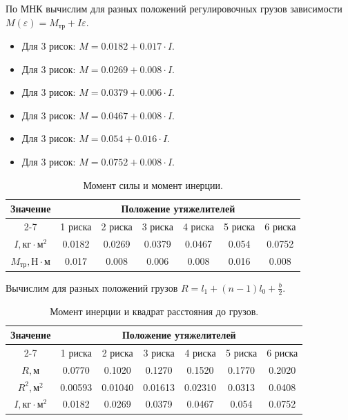 \documentclass[14pt]{extreport}
\begin{document}
По МНК вычислим для разных положений регулировочных грузов зависимости $M(\varepsilon) = M_\text{тр}+I\varepsilon$.

\begin{itemize}
	\item Для 3 рисок: $M = 0.0182+0.017 \cdot I$.
	\item Для 3 рисок: $M = 0.0269+0.008 \cdot I$.
	\item Для 3 рисок: $M = 0.0379+0.006 \cdot I$.
	\item Для 3 рисок: $M = 0.0467+0.008 \cdot I$.
	\item Для 3 рисок: $M = 0.054+0.016 \cdot I$.
	\item Для 3 рисок: $M = 0.0752+0.008 \cdot I$.

\end{itemize}

\begin{table}[H]
\centering
\caption{Момент силы и момент инерции.}
\label{tab:indirect2104}
\begin{tabular}{|c|c|c|c|c|c|c|}
\hline
\multirow{3}{*}{\textbf{Значение}} & 
\multicolumn{6}{c|}{\textbf{Положение утяжелителей}} \\ \cline{2-7}
& 1 риска & 2 риска & 3 риска & 4 риска & 5 риска & 6 риска \\ \hline
$I, \text{кг}\cdot\text{м}^2$ & 0.0182 & 0.0269 & 0.0379 & 0.0467 & 0.054 & 0.0752 \\ \hline
$M_\text{тр}, \text{Н}\cdot\text{м}$ & 0.017 & 0.008 & 0.006 & 0.008 & 0.016 & 0.008 \\ \hline

\end{tabular}
\end{table}

Вычислим для разных положений грузов $R = l_1 + (n - 1)l_0 + \frac{b}{2}$.

\begin{table}[H]
\centering
\caption{Момент инерции и квадрат расстояния до грузов.}
\label{tab:indirect3104}
\begin{tabular}{|c|c|c|c|c|c|c|}
\hline
\multirow{3}{*}{\textbf{Значение}} & 
\multicolumn{6}{c|}{\textbf{Положение утяжелителей}} \\ \cline{2-7}
& 1 риска & 2 риска & 3 риска & 4 риска & 5 риска & 6 риска \\ \hline
$R, \text{м}$ & 0.0770 & 0.1020 & 0.1270 & 0.1520 & 0.1770 & 0.2020 \\ \hline
$R^2, \text{м}^2$ & 0.00593 & 0.01040 & 0.01613 & 0.02310 & 0.0313 & 0.0408 \\ \hline
$I, \text{кг}\cdot\text{м}^2$ & 0.0182 & 0.0269 & 0.0379 & 0.0467 & 0.054 & 0.0752 \\ \hline

\end{tabular}
\end{table}
\end{document}
